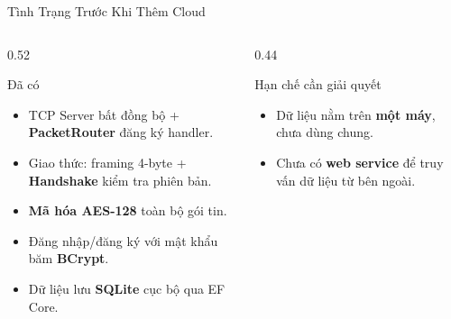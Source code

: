 \begin{frame}{Tình Trạng Trước Khi Thêm Cloud}
  \begin{columns}[T]
    \begin{column}{0.52\textwidth}
      \begin{block}{Đã có}
        \begin{itemize}
          \item TCP Server bất đồng bộ + \textbf{PacketRouter} đăng ký handler.
          \item Giao thức: framing 4-byte + \textbf{Handshake} kiểm tra phiên bản.
          \item \textbf{Mã hóa AES-128} toàn bộ gói tin.
          \item Đăng nhập/đăng ký với mật khẩu băm \textbf{BCrypt}.
          \item Dữ liệu lưu \textbf{SQLite} cục bộ qua EF Core.
        \end{itemize}
      \end{block}
    \end{column}
    \begin{column}{0.44\textwidth}
      \begin{alertblock}{Hạn chế cần giải quyết}
        \begin{itemize}
          \item Dữ liệu nằm trên \textbf{một máy}, chưa dùng chung.
          \item Chưa có \textbf{web service} để truy vấn dữ liệu từ bên ngoài.
        \end{itemize}
      \end{alertblock}
    \end{column}
  \end{columns}
\end{frame}
